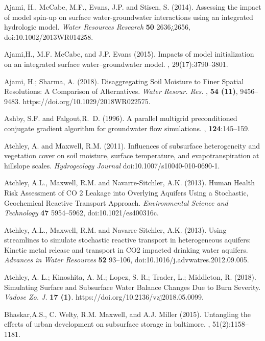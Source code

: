 \begin{thebibliography}{999}

Ajami, H., McCabe, M.F., Evans, J.P. and Stisen, S. (2014). Assessing the impact of model spin-up on surface water-groundwater interactions using an integrated hydrologic model. {\em Water Resources Research} {\bf 50} 2636¿2656, doi:10.1002/2013WR014258.


Ajami,H., M.F. McCabe, and J.P. Evans (2015).
\newblock Impacts of model initialization on an integrated surface water--groundwater model.
, 29(17):3790--3801.

Ajami, H.; Sharma, A. (2018). Disaggregating Soil Moisture to Finer Spatial Resolutions: A Comparison of Alternatives. {\em Water Resour. Res.} , {\bf 54 (11)}, 9456–9483. https://doi.org/10.1029/2018WR022575.

Ashby, S.F. and Falgout,R.~D. (1996).
\newblock A parallel multigrid preconditioned conjugate gradient algorithm for
  groundwater flow simulations.
, {\bf 124}:145--159.

Atchley, A. and Maxwell, R.M. (2011). Influences of subsurface heterogeneity and vegetation cover on soil moisture, surface temperature, and evapotranspiration at hillslope scales. {\em Hydrogeology Journal} doi:10.1007/s10040-010-0690-1.

Atchley, A.L., Maxwell, R.M. and Navarre-Sitchler, A.K. (2013). Human Health Risk Assessment of CO 2 Leakage into Overlying Aquifers Using a Stochastic, Geochemical Reactive Transport Approach. {\em Environmental Science and Technology} {\bf 47} 5954--5962, doi:10.1021/es400316c.

Atchley, A.L., Maxwell, R.M. and Navarre-Sitchler, A.K. (2013). Using streamlines to simulate stochastic reactive transport in heterogeneous aquifers: Kinetic metal release and transport in CO2 impacted drinking water aquifers. {\em Advances in Water Resources} {\bf 52} 93--106, doi:10.1016/j.advwatres.2012.09.005.

Atchley, A. L.; Kinoshita, A. M.; Lopez, S. R.; Trader, L.; Middleton, R. (2018). Simulating Surface and Subsurface Water Balance Changes Due to Burn Severity. {\em Vadose Zo. J.} {\bf 17 (1)}. https://doi.org/10.2136/vzj2018.05.0099.

Bhaskar,A.S., C. Welty, R.M. Maxwell, and A.J. Miller (2015).
\newblock Untangling the effects of urban development on subsurface storage in
  baltimore.
, 51(2):1158--1181.


\end{thebibliography}
